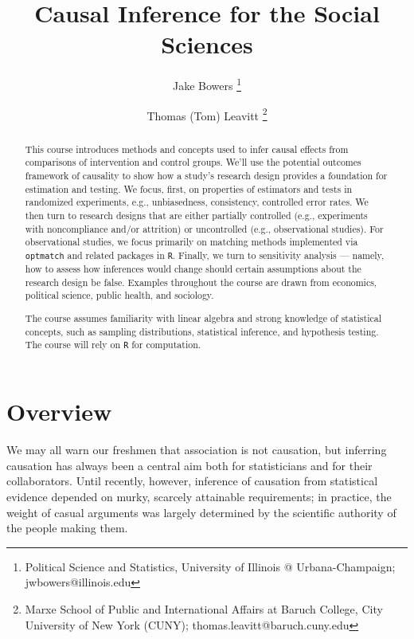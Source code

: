 \documentclass[12pt]{article}
\title{Causal Inference for the Social Sciences}
\author{Jake Bowers \thanks{Political Science and Statistics, University of Illinois @ Urbana-Champaign; \mbox{jwbowers@illinois.edu}} \and
    Thomas (Tom) Leavitt \thanks{Marxe School of Public and International Affairs at Baruch College, City University of New York (CUNY); \mbox{thomas.leavitt@baruch.cuny.edu}}
}
\begin{document}
\pagestyle{myfancy}

\maketitle
\begin{abstract}
\noindent This course introduces methods and concepts used to infer causal effects from comparisons of intervention and control groups. We'll use the potential outcomes framework of causality to show how a study's research design provides a foundation for estimation and testing. We focus, first, on properties of estimators and tests in randomized experiments, e.g., unbiasedness, consistency, controlled error rates. We then turn to research designs that are either partially controlled (e.g., experiments with noncompliance and/or attrition) or uncontrolled (e.g., observational studies). For observational studies, we focus primarily on matching methods implemented via \texttt{optmatch} and related packages in \texttt{R}. Finally, we turn to sensitivity analysis --- namely, how to assess how inferences would change should certain assumptions about the research design be false. Examples throughout the course are drawn from economics, political science, public health, and sociology.

The course assumes familiarity with linear algebra and strong knowledge of statistical concepts, such as sampling distributions, statistical inference, and hypothesis testing. The course will rely on \texttt{R} for computation.

\end{abstract}




\clearpage



\section*{Overview}

We may all warn our freshmen that association is not causation, but inferring causation has always been a central aim both for statisticians and for their collaborators. Until recently, however, inference of causation from statistical evidence depended on murky, scarcely attainable requirements; in practice, the weight of casual arguments was largely determined by the scientific authority of the people making them.
\end{document}
